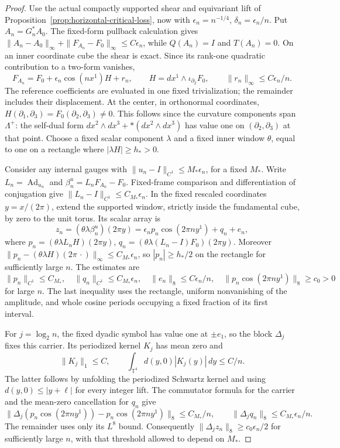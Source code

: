 \documentclass[11pt]{article}
\numberwithin{equation}{section}
\theoremstyle{definition}
\theoremstyle{remark}
\begin{document}
\begin{proof}
Use the actual compactly supported shear and equivariant lift
of Proposition~\ref{prop:horizontal-critical-loss}, now with
\(\epsilon_n=n^{-1/4}\), \(\delta_n=\epsilon_n/n\).
Put \(A_n=G_n^*A_0\).
The fixed-form pullback calculation gives
\(\|A_n-A_0\|_\infty+\|F_{A_n}-F_0\|_\infty\le C\epsilon_n\),
while \(Q(A_n)=I\) and \(T(A_n)=0\).
On an inner coordinate cube the shear is exact. Since its
rank-one quadratic contribution to a two-form vanishes,
\[
 F_{A_n}=F_0+\epsilon_n\cos(nx^1)H+r_n,\qquad
 H=dx^1\wedge\iota_{\partial_2}F_0,\qquad
 \|r_n\|_\infty\le C\epsilon_n/n .
\]
The reference coefficients are evaluated in one fixed
trivialization; the remainder includes their displacement.
At the center, in orthonormal coordinates,
\(H(\partial_1,\partial_3)=F_0(\partial_2,\partial_3)\ne0\).
This follows since the curvature components span \(\Lambda^+\):
the self-dual form \(dx^2\wedge dx^3+*(dx^2\wedge dx^3)\)
has value one on \((\partial_2,\partial_3)\) at that point.
Choose a fixed scalar component \(\lambda\) and a fixed inner
window \(\theta\), equal to one on a rectangle where
\(|\lambda H|\ge h_*>0\).

Consider any internal gauges with
\(\|u_n-I\|_{C^1}\le M_*\epsilon_n\), for a fixed \(M_*\).
Write \(L_n=\operatorname{Ad}_{u_n}\) and
\(\beta_n^u=L_nF_{A_n}-F_0\).
Fixed-frame comparison and differentiation of conjugation give
\(\|L_n-I\|_{C^1}\le C_{M_*}\epsilon_n\).
In the fixed rescaled coordinates \(y=x/(2\pi)\), extend the
supported window, strictly inside the fundamental cube, by zero
to the unit torus. Its scalar array is
\[
 z_n=(\theta\lambda\beta_n^u)(2\pi y)
       =\epsilon_n p_n\cos(2\pi n y^1)+q_n+e_n,
\]
where \(p_n=(\theta\lambda L_nH)(2\pi y)\),
\(q_n=(\theta\lambda(L_n-I)F_0)(2\pi y)\).
Moreover
\(\|p_n-(\theta\lambda H)(2\pi\,\cdot)\|_\infty
\le C_{M_*}\epsilon_n\), so \(|p_n|\ge h_*/2\) on the
rectangle for sufficiently large \(n\).
The estimates are
\[
 \|p_n\|_{C^1}\le C_{M_*},\quad
 \|q_n\|_{C^1}\le C_{M_*}\epsilon_n,\quad
 \|e_n\|_8\le C\epsilon_n/n,\quad
 \|p_n\cos(2\pi n y^1)\|_8\ge c_0>0
\]
for large \(n\). The last inequality uses the rectangle,
uniform nonvanishing of the amplitude, and whole cosine
periods occupying a fixed fraction of its first interval.

For \(j=\log_2 n\), the fixed dyadic symbol has value one
at \(\pm e_1\), so the block \(\Delta_j\) fixes this carrier.
Its periodized kernel \(K_j\) has mean zero and
\[
 \|K_j\|_1\le C,\qquad
 \int_{\mathbb T^4}d(y,0)|K_j(y)|\,dy\le C/n .
\]
The latter follows by unfolding the periodized Schwartz
kernel and using \(d(y,0)\le |y+\ell|\) for every integer
lift. The commutator formula for the carrier and the
mean-zero cancellation for \(q_n\) give
\[
 \|\Delta_j(p_n\cos(2\pi n y^1))-p_n\cos(2\pi n y^1)\|_8
       \le C_{M_*}/n,\qquad
 \|\Delta_j q_n\|_8\le C_{M_*}\epsilon_n/n.
\]
The remainder uses only its \(L^8\) bound. Consequently
\(\|\Delta_j z_n\|_8\ge c_0\epsilon_n/2\) for sufficiently
large \(n\), with that threshold allowed to depend on \(M_*\).


\end{proof}
\end{document}
